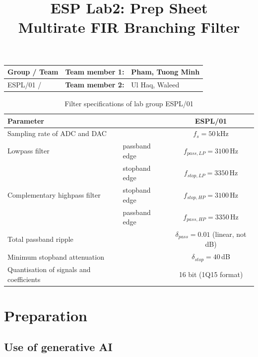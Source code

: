 \documentclass[a4paper,11pt]{article}
\title{ESP Lab2: Prep Sheet\\ \large Multirate FIR Branching Filter}
\begin{document}
	\sloppy
	\maketitle
	
	\begin{table}[h]
		\centering
		\begin{tabular}{|l|l|l|}
			\hline
			\textbf{Group / Team} & \textbf{Team member 1:} & Pham, Tuong Minh \\
			\hline
			ESPL/01 / & \textbf{Team member 2: } & Ul Haq, Waleed \\
			\hline
		\end{tabular}
	\end{table}
	
	\begin{table}[h]
		\centering
		\caption{Filter specifications of lab group ESPL/01}
		\small
		\begin{tabular}{|l|l|c|}
			\hline
			\textbf{Parameter} & & \textbf{ESPL/01} \\
			\hline
			Sampling rate of ADC and DAC & & $f_s = 50$\,kHz \\
			\hline
			Lowpass filter & passband edge & $f_{pass,LP} = 3100$\,Hz \\
			& stopband edge & $f_{stop,LP} = 3350$\,Hz \\
			\hline
			Complementary highpass filter & stopband edge & $f_{stop,HP} = 3100$\,Hz \\
			& passband edge & $f_{pass,HP} = 3350$\,Hz \\
			\hline
			Total passband ripple & & $\delta_{pass} = 0.01$ (linear, not dB) \\
			\hline
			Minimum stopband attenuation & & $\delta_{stop} = 40$\,dB \\
			\hline
			Quantisation of signals and coefficients & & 16 bit (1Q15 format) \\
			\hline
		\end{tabular}
	\end{table}
	
	\setcounter{section}{2}
	\section{Preparation}
	
	\subsection*{Use of generative AI}
	
\end{document}
